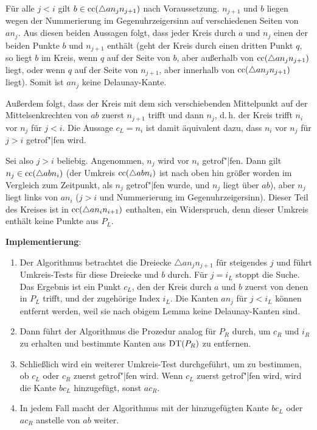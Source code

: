 \begin{Beweis}
    Für alle $j < i$ gilt $b \in \operatorname{cc}(\triangle a n_j n_{j+1})$ nach Voraussetzung.
    $n_{j+1}$ und $b$ liegen wegen der Nummerierung im Gegenuhrzeigersinn auf verschiedenen Seiten
    von $an_j$.
    Aus diesen beiden Aussagen folgt, dass jeder Kreis durch $a$ und $n_j$
    einen der beiden Punkte $b$ und $n_{j+1}$ enthält
    (geht der Kreis durch einen dritten Punkt $q$,
    so liegt $b$ im Kreis, wenn $q$ auf der Seite von $b$, aber außerhalb von
    $\operatorname{cc}(\triangle a n_j n_{j+1})$ liegt,
    oder wenn $q$ auf der Seite von $n_{j+1}$, aber innerhalb von $\operatorname{cc}(\triangle a n_j n_{j+1})$
    liegt).
    Somit ist $an_j$ keine Delaunay-Kante.

    Außerdem folgt, dass der Kreis mit dem sich verschiebenden Mittelpunkt auf der
    Mittelsenkrechten von $ab$ zuerst $n_{j+1}$ trifft und dann $n_j$,
    d.\,h. der Kreis trifft $n_i$ vor $n_j$ für $j < i$.
    Die Aussage $c_L = n_i$ ist damit äquivalent dazu, dass $n_i$ vor $n_j$ für $j > i$
    getrof"|fen wird.

    Sei also $j > i$ beliebig.
    Angenommen, $n_j$ wird vor $n_i$ getrof"|fen.
    Dann gilt $n_j \in \operatorname{cc}(\triangle abn_i)$
    (der Umkreis $\operatorname{cc}(\triangle abn_i)$ ist nach oben hin größer worden im Vergleich zum
    Zeitpunkt, als $n_j$ getrof"|fen wurde, und $n_j$ liegt über $ab$),
    aber $n_j$ liegt links von $an_i$
    ($j > i$ und Nummerierung im Gegenuhrzeigersinn).
    Dieser Teil des Kreises ist in $\operatorname{cc}(\triangle an_i n_{i+1})$ enthalten,
    ein Widerspruch, denn dieser Umkreis enthält keine Punkte aus $P_L$.
\end{Beweis}

\linie

\textbf{Implementierung}:
\begin{enumerate}
    \item
    Der Algorithmus betrachtet die Dreiecke $\triangle a n_j n_{j+1}$ für steigendes $j$ und
    führt Umkreis-Tests für diese Dreiecke und $b$ durch.
    Für $j = i_L$ stoppt die Suche.
    Das Ergebnis ist ein Punkt $c_L$, den der Kreis durch $a$ und $b$ zuerst von denen in $P_L$
    trifft, und der zugehörige Index $i_L$.
    Die Kanten $an_j$ für $j < i_L$ können entfernt werden, weil sie nach obigem Lemma keine
    Delaunay-Kanten sind.

    \item
    Dann führt der Algorithmus die Prozedur analog für $P_R$ durch, um $c_R$ und $i_R$ zu
    erhalten und bestimmte Kanten aus $\operatorname{DT}(P_R)$ zu entfernen.

    \item
    Schließlich wird ein weiterer Umkreis-Test durchgeführt, um zu bestimmen, ob $c_L$ oder $c_R$
    zuerst getrof"|fen wird.
    Wenn $c_L$ zuerst getrof"|fen wird, wird die Kante $bc_L$ hinzugefügt,
    sonst $ac_R$.

    \item
    In jedem Fall macht der Algorithmus mit der hinzugefügten Kante $bc_L$ oder $ac_R$
    anstelle von $ab$ weiter.
\end{enumerate}

